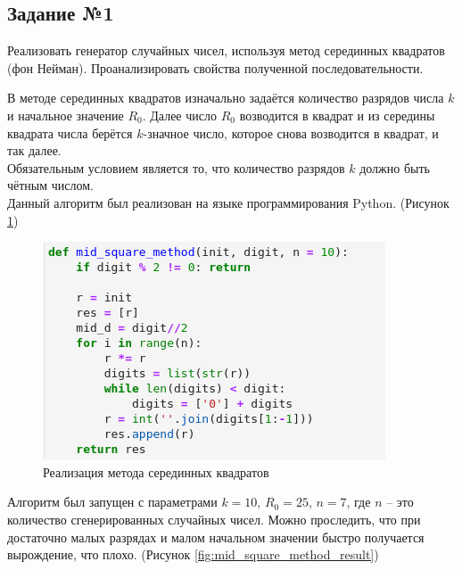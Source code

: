 \documentclass[14pt,fleqn]{extarticle}
\begin{document}
    \subsection*{Задание №1}
    Реализовать генератор случайных чисел, используя метод серединных квадратов (фон Нейман). Проанализировать свойства полученной последовательности.\\
    \newline

    В методе серединных квадратов изначально задаётся количество разрядов числа $k$ и начальное значение $R_0$. Далее число $R_0$ возводится в квадрат и из середины квадрата числа берётся $k$-значное число, которое снова возводится в квадрат, и так далее.\\
    Обязательным условием является то, что количество разрядов $k$ должно быть чётным числом.\\
    \newline
    Данный алгоритм был реализован на языке программирования Python. (Рисунок \ref{fig:mid_square_method_code})
    \begin{figure}[h]
        \centering \includegraphics[scale=0.8]{mid_square_method_code}
        \caption{Реализация метода серединных квадратов}
        \label{fig:mid_square_method_code}
    \end{figure}
    \newpage
    Алгоритм был запущен с параметрами $k = 10$, $R_0 = 25$, $n = 7$, где $n$ -- это количество сгенерированных случайных чисел. Можно проследить, что при достаточно малых разрядах и малом начальном значении быстро получается вырождение, что плохо. (Рисунок \ref{fig:mid_square_method_result})
\end{document}
